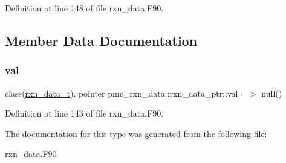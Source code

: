 Definition at line 148 of file rxn\+\_\+data.\+F90.



\subsection{Member Data Documentation}
\mbox{\label{structpmc__rxn__data_1_1rxn__data__ptr_a1b9244e8a9daf85e650052ef16ccac50}} 
\subsubsection{\texorpdfstring{val}{val}}
{\footnotesize\ttfamily class(\mbox{\hyperlink{structpmc__rxn__data_1_1rxn__data__t}{rxn\+\_\+data\+\_\+t}}), pointer pmc\+\_\+rxn\+\_\+data\+::rxn\+\_\+data\+\_\+ptr\+::val =$>$ null()\hspace{0.3cm}{\ttfamily [private]}}



Definition at line 143 of file rxn\+\_\+data.\+F90.



The documentation for this type was generated from the following file\+:\begin{DoxyCompactItemize}
\item 
\mbox{\hyperlink{rxn__data_8_f90}{rxn\+\_\+data.\+F90}}\end{DoxyCompactItemize}
